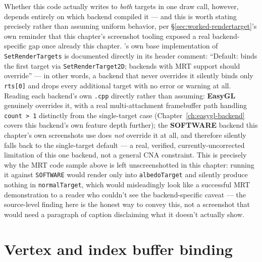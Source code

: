 Whether this code actually writes to \emph{both} targets in one draw call, however, depends
entirely on which backend compiled it --- and this is worth stating precisely rather than
assuming uniform behavior, per \S\ref{sec:worked-rendertarget}'s own reminder that this
chapter's screenshot tooling exposed a real backend-specific gap once already this chapter.
's own base implementation of \texttt{SetRenderTargets} is
documented directly in its header comment: ``Default: binds the first target via
\texttt{SetRenderTarget2D}; backends with MRT support should override'' --- in other words,
a backend that never overrides it silently binds only \texttt{rts[0]} and drops every
additional target with no error or warning at all. Reading each backend's own
\texttt{.cpp} directly rather than assuming: \textbf{EasyGL} genuinely overrides it, with a
real multi-attachment framebuffer path handling \texttt{count > 1} distinctly from the
single-target case (Chapter~\ref{ch:easygl-backend} covers this backend's own feature depth
further); the \textbf{SOFTWARE} backend this chapter's own screenshots use does
\emph{not} override it at all, and therefore silently falls back to the single-target default
--- a real, verified, currently-uncorrected limitation of this one backend, not a general CNA
constraint. This is precisely why the MRT code sample above is left unscreenshotted in this
chapter: running it against \texttt{SOFTWARE} would render only into \texttt{albedoTarget} and
silently produce nothing in \texttt{normalTarget}, which would misleadingly look like a
successful MRT demonstration to a reader who couldn't see the backend-specific caveat --- the
source-level finding here is the honest way to convey this, not a screenshot that would need a
paragraph of caption disclaiming what it doesn't actually show.

\section{Vertex and index buffer binding}
\label{sec:vertex-index-binding}

